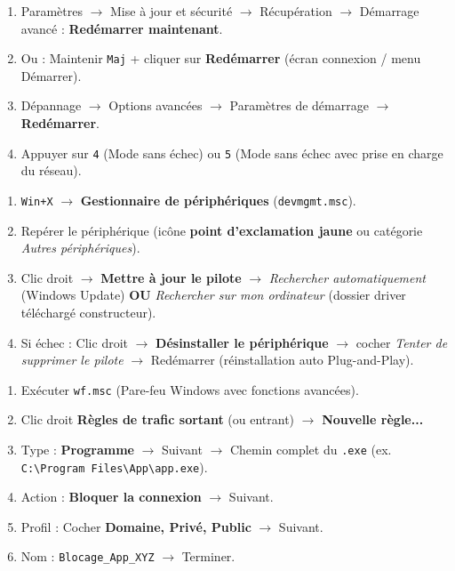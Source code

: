 \documentclass[11pt]{article}
\begin{document}
\begin{bilan}
\begin{methode}
\begin{enumerate}    \item Paramètres $\rightarrow$ Mise à jour et sécurité $\rightarrow$ Récupération $\rightarrow$ Démarrage avancé : \textbf{Redémarrer maintenant}.
    \item Ou : Maintenir \texttt{Maj} + cliquer sur \textbf{Redémarrer} (écran connexion / menu Démarrer).
    \item Dépannage $\rightarrow$ Options avancées $\rightarrow$ Paramètres de démarrage $\rightarrow$ \textbf{Redémarrer}.
    \item Appuyer sur \texttt{4} (Mode sans échec) ou \texttt{5} (Mode sans échec avec prise en charge du réseau).
\end{enumerate}
\end{methode}

\begin{methode}
\begin{enumerate}    \item \texttt{Win+X} $\rightarrow$ \textbf{Gestionnaire de périphériques} (\texttt{devmgmt.msc}).
    \item Repérer le périphérique (icône \textbf{point d'exclamation jaune} ou catégorie \emph{Autres périphériques}).
    \item Clic droit $\rightarrow$ \textbf{Mettre à jour le pilote} $\rightarrow$ \emph{Rechercher automatiquement} (Windows Update) \textbf{OU} \emph{Rechercher sur mon ordinateur} (dossier driver téléchargé constructeur).
    \item Si échec : Clic droit $\rightarrow$ \textbf{Désinstaller le périphérique} $\rightarrow$ cocher \emph{Tenter de supprimer le pilote} $\rightarrow$ Redémarrer (réinstallation auto Plug-and-Play).
\end{enumerate}
\end{methode}

\begin{methode}
\begin{enumerate}    \item Exécuter \texttt{wf.msc} (Pare-feu Windows avec fonctions avancées).
    \item Clic droit \textbf{Règles de trafic sortant} (ou entrant) $\rightarrow$ \textbf{Nouvelle règle...}
    \item Type : \textbf{Programme} $\rightarrow$ Suivant $\rightarrow$ Chemin complet du \texttt{.exe} (ex. \texttt{C:\textbackslash Program Files\textbackslash App\textbackslash app.exe}).
    \item Action : \textbf{Bloquer la connexion} $\rightarrow$ Suivant.
    \item Profil : Cocher \textbf{Domaine, Privé, Public} $\rightarrow$ Suivant.
    \item Nom : \texttt{Blocage\_App\_XYZ} $\rightarrow$ Terminer.
\end{enumerate}
\end{methode}


\end{bilan}
\end{document}
